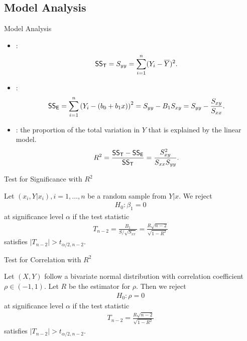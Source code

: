 \subsection{Model Analysis}

\begin{frame}{Model Analysis}

\begin{itemize}
	\justifying
	\item {}:
	\begin{align*}
	\mathsf{SS_T} = S_{yy} = \sum_{i=1}^n (Y_i-\overline{Y})^2.
	\end{align*}
	\item {}:
	\begin{align*}
	\mathsf{SS_E} = \sum_{i=1}^n \left(Y_i-(b_0+b_1x)\right)^2 = S_{yy} - B_1 S_{xy} = S_{yy} - \frac{S_{xy}}{S_{xx}}.
	\end{align*}
	\item {}: the proportion of the total variation in $Y$ that is explained by the linear model.
	\begin{align*}
	R^2 = \frac{\mathsf{SS_T} - \mathsf{SS_E}}{\mathsf{SS_T}} = \frac{S_{xy}^2}{S_{xx}S_{yy}}.
	\end{align*}
\end{itemize}

\end{frame}


\begin{frame}{Test for Significance with $R^2$}

\justifying
{} Let $(x_i, Y|x_i), i = 1, \ldots, n$ be a random sample from $Y|x$. We reject
\begin{align*}
H_0: \beta_1 = 0
\end{align*}
at significance level $\alpha$ if the test statistic
\begin{align*}
T_{n-2} = \frac{B_1}{S/\sqrt{S_{xx}}} = \frac{R\sqrt{n-2}}{\sqrt{1-R^2}}
\end{align*}
satisfies $|T_{n-2}| > t_{\alpha/2,n-2}$.

\end{frame}


\begin{frame}{Test for Correlation with $R^2$}

 Let $(X, Y)$ follow a bivariate normal distribution with correlation coefficient $\rho\in (-1, 1)$. Let $R$ be the estimator for $\rho$. Then we reject
\begin{align*}
H_0: \rho = 0
\end{align*}
at significance level $\alpha$ if the test statistic
\begin{align*}
T_{n-2} = \frac{R\sqrt{n-2}}{\sqrt{1-R^2}}
\end{align*}
satisfies $|T_{n-2}| > t_{\alpha/2,n-2}$.

\end{frame}


